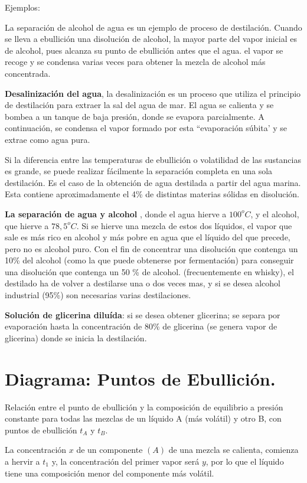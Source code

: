 \documentclass[10pt,twocolumn,openany]{book}
\begin{document}
Ejemplos:

La separación de alcohol de agua es un ejemplo de proceso de destilación. Cuando se lleva a ebullición 
una disolución de alcohol, la mayor parte del vapor inicial es de alcohol, pues alcanza su punto de 
ebullición antes que el agua. el vapor se recoge y se condensa varias veces para obtener la mezcla de alcohol
más concentrada.

\textbf{Desalinización del agua}, la desalinización es un proceso que utiliza el principio de destilación para 
extraer la sal del agua de mar. El agua se calienta y se bombea a un tanque de baja presión, donde 
se evapora parcialmente. A continuación, se condensa el vapor formado por esta ``evaporación súbita' y se 
extrae como agua pura.

Si la diferencia entre las temperaturas de ebullición o volatilidad de las sustancias es grande, se 
puede realizar fácilmente la separación completa en una sola destilación. Es el caso de la obtención de
agua destilada a partir del agua marina. Esta contiene aproximadamente el 4\% de distintas materias 
sólidas en disolución.

\textbf{La separación de agua y alcohol} , donde el agua hierve a $100^oC$, y el alcohol, que hierve a $78,5^oC$. Si 
se hierve una mezcla de estos dos líquidos, el vapor que sale es más rico en alcohol y más pobre en 
agua que el líquido del que precede, pero no es alcohol puro. Con el fin de concentrar una 
disolución que contenga un 10\% del alcohol (como la que puede obtenerse por fermentación) para 
conseguir una disolución que contenga un 50 \% de alcohol. (frecuentemente en whisky), el destilado ha 
de volver a destilarse una o dos veces mas, y si se desea alcohol industrial (95\%) son necesarias 
varias destilaciones.

\textbf{Solución de glicerina diluída}: si se desea obtener glicerina; se separa por evaporación hasta la 
concentración de 80\% de glicerina (se genera vapor de glicerina) donde se inicia la destilación.

\section{Diagrama: Puntos de Ebullición.}

Relación entre el punto de ebullición y la composición de equilibrio a presión constante para todas las 
mezclas de un líquido A (más volátil) y otro B, con puntos de ebullición $t_A$ y $t_B$.

La concentración $x$ de un componente $(A)$ de una mezcla se calienta, comienza a hervir a $t_1$ y, la 
concentración del primer vapor será $y$, por lo que el líquido tiene una composición menor del componente más volátil.
\end{document}
